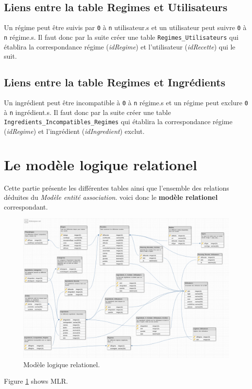 \subsection{Liens entre la table Regimes et Utilisateurs}
Un régime peut être suivis par \texttt{0} à \texttt{n} utilisateur.s et un utilisateur peut suivre \texttt{0} à \texttt{n} régime.s. Il faut donc par la suite créer une table \texttt{Regimes\_Utilisateurs} qui établira la correspondance régime (\textit{idRegime}) et l'utilisateur (\textit{idRecette}) qui le suit.

\subsection{Liens entre la table Regimes et Ingrédients}
Un ingrédient peut être incompatible à \texttt{0} à \texttt{n} régime.s et un régime peut exclure \texttt{0} à \texttt{n} ingrédient.s. Il faut donc par la suite créer une table \texttt{Ingredients\_Incompatibles\_Regimes} qui établira la correspondance régime (\textit{idRegime}) et l'ingrédient (\textit{idIngredient}) exclut.

\section{Le modèle logique relationel}
Cette partie présente les différentes tables ainsi que l'ensemble des relations déduites du \textit{Modèle entité association}. voici donc le \textbf{modèle relationel} correspondant.

\begin{figure}
    \includegraphics[scale=0.3]{images/index.png}
    \caption{Modèle logique relationel.}
    \label{fig:modele E/R}
\end{figure}
Figure \ref{fig:modele E/R} shows MLR.